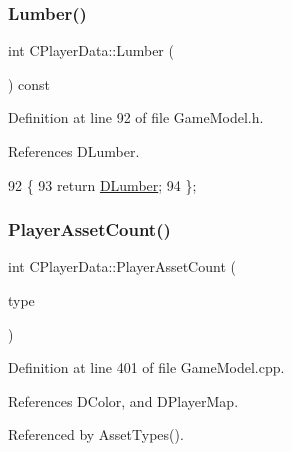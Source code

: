 \subsubsection{\texorpdfstring{Lumber()}{Lumber()}}
{\footnotesize\ttfamily int C\+Player\+Data\+::\+Lumber (\begin{DoxyParamCaption}{ }\end{DoxyParamCaption}) const\hspace{0.3cm}{\ttfamily [inline]}}



Definition at line 92 of file Game\+Model.\+h.



References D\+Lumber.


\begin{DoxyCode}
92                           \{
93             \textcolor{keywordflow}{return} \hyperlink{classCPlayerData_adf3bf2fa49b5c8a4fb9a478d95f688c4}{DLumber};  
94         \};
\end{DoxyCode}
\hypertarget{classCPlayerData_a3fe55bd902f7a819c0689825d8ad3e4c}{}\label{classCPlayerData_a3fe55bd902f7a819c0689825d8ad3e4c} 
\subsubsection{\texorpdfstring{Player\+Asset\+Count()}{PlayerAssetCount()}}
{\footnotesize\ttfamily int C\+Player\+Data\+::\+Player\+Asset\+Count (\begin{DoxyParamCaption}\item[{\hyperlink{GameDataTypes_8h_a5600d4fc433b83300308921974477fec}{E\+Asset\+Type}}]{type }\end{DoxyParamCaption})}



Definition at line 401 of file Game\+Model.\+cpp.



References D\+Color, and D\+Player\+Map.



Referenced by Asset\+Types().


